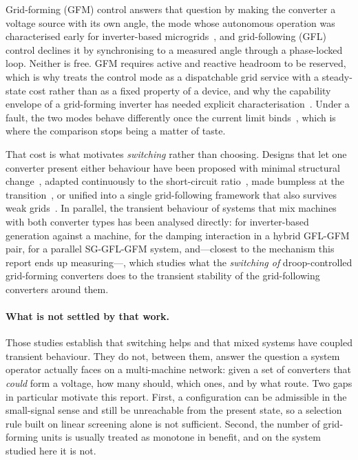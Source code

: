 \documentclass[12pt,a4paper]{article}
\theoremstyle{remark}
\begin{document}
Grid-forming (GFM) control answers that question by making the converter a voltage
source with its own angle, the mode whose autonomous operation was characterised
early for inverter-based microgrids~\cite{pogaku2007}, and grid-following (GFL) control declines it by
synchronising to a measured angle through a phase-locked loop. Neither is free.
GFM requires active and reactive headroom to be reserved, which is why
\cite{cui2025} treats the control mode as a dispatchable grid service with a
steady-state cost rather than as a fixed property of a device, and why the
capability envelope of a grid-forming inverter has needed explicit
characterisation~\cite{nurunnabi2025}. Under a fault, the two modes behave
differently once the current limit binds~\cite{almesri2025}, which is where the
comparison stops being a matter of taste.

That cost is what motivates \emph{switching} rather than choosing. Designs that let
one converter present either behaviour have been proposed with minimal structural
change~\cite{ding2025}, adapted continuously to the short-circuit
ratio~\cite{liu2024}, made bumpless at the transition~\cite{gao2025}, or unified
into a single grid-following framework that also survives weak
grids~\cite{askarian2024}. In parallel, the transient behaviour of systems that
mix machines with both converter types has been analysed directly: \cite{he2022}
for inverter-based generation against a machine, \cite{qu2025} for the damping
interaction in a hybrid GFL-GFM pair, \cite{chen2025} for a parallel
SG-GFL-GFM system, and---closest to the mechanism this report ends up
measuring---\cite{li2026}, which studies what the \emph{switching of}
droop-controlled grid-forming converters does to the transient stability of the
grid-following converters around them.

\paragraph{What is not settled by that work.}
Those studies establish that switching helps and that mixed systems have coupled
transient behaviour. They do not, between them, answer the question a system
operator actually faces on a multi-machine network: given a set of converters that
\emph{could} form a voltage, how many should, which ones, and by what route. Two
gaps in particular motivate this report. First, a configuration can be admissible
in the small-signal sense and still be unreachable from the present state, so a
selection rule built on linear screening alone is not sufficient. Second, the
number of grid-forming units is usually treated as monotone in benefit, and on the
system studied here it is not.
\end{document}
